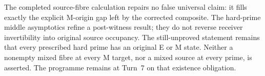 The completed source-fibre calculation repairs no false universal claim:
it fills exactly the explicit M-origin gap left by the corrected composite.
The hard-prime middle asymptotics refine a post-witness result; they do not
reverse receiver invertibility into original source occupancy.
The still-unproved statement remains that every prescribed hard prime has
an original E or M state. Neither a nonempty mixed fibre at every M target,
nor a mixed source at every prime, is asserted. The programme remains at
Turn~7 on that existence obligation.
